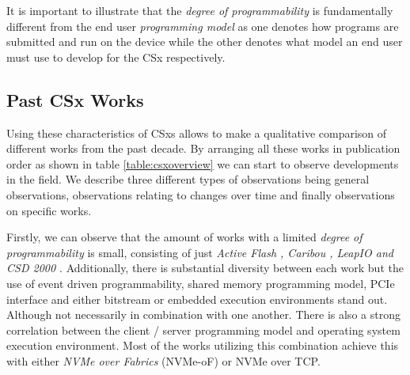 
It is important to illustrate that the \textit{degree of programmability} is
fundamentally different from the end user \textit{programming model} as one
denotes how programs are submitted and run on the device while the other denotes
what model an end user must use to develop for the CSx respectively.

\subsection{Past CSx Works}

Using these characteristics of CSxs allows to make a qualitative comparison of
different works from the past decade. By arranging all these works in
publication order as shown in table \ref{table:csxoverview} we can start to
observe developments in the field. We describe three different types of
observations being general observations, observations relating to changes over
time and finally observations on specific works.

Firstly, we can observe that the amount of works with a limited \textit{degree
of programmability} is small, consisting of just \textit{Active Flash
\cite{active-flash-piller, 2013-fast-active-flash},
Caribou \cite{10.14778/3137628.3137632}, LeapIO \cite{10.1145/3373376.3378531}
and CSD 2000 \cite{10.1145/3399666.3399934}}. Additionally, there is substantial
diversity between each work but the use of event driven programmability, shared
memory programming model, PCIe interface and either bitstream or embedded
execution environments stand out. Although not necessarily in combination with
one another. There is also a strong correlation between the client / server
programming model and operating system execution environment. Most of the works
utilizing this combination achieve this with either \textit{NVMe over Fabrics}
(NVMe-oF) or NVMe over TCP.

